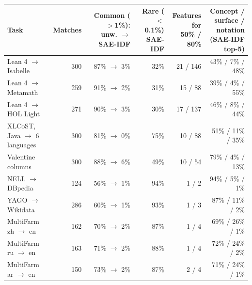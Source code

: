\begin{tabular}{@{}lrrrrr@{}}
\toprule
Task & Matches & \makecell[r]{Common ($>$1\%):\\unw. $\to$ SAE-IDF} & \makecell[r]{Rare ($<$0.1\%)\\SAE-IDF} & \makecell[r]{Features for\\50\% / 80\%} & \makecell[r]{Concept / surface / notation\\(SAE-IDF top-5)} \\
\midrule
Lean 4 $\to$ Isabelle & 300 & 87\% $\to$ 3\% & 32\% & 21 / 146 & 43\% / 7\% / 48\% \\
Lean 4 $\to$ Metamath & 259 & 91\% $\to$ 2\% & 31\% & 15 / 88 & 39\% / 4\% / 55\% \\
Lean 4 $\to$ HOL Light & 271 & 90\% $\to$ 3\% & 30\% & 17 / 137 & 46\% / 8\% / 44\% \\
XLCoST, Java $\to$ 6 languages & 300 & 81\% $\to$ 0\% & 75\% & 10 / 88 & 51\% / 11\% / 35\% \\
Valentine columns & 300 & 88\% $\to$ 6\% & 49\% & 10 / 54 & 79\% / 4\% / 13\% \\
NELL $\to$ DBpedia & 124 & 56\% $\to$ 1\% & 94\% & 1 / 2 & 94\% / 5\% / 1\% \\
YAGO $\to$ Wikidata & 286 & 60\% $\to$ 1\% & 93\% & 1 / 3 & 87\% / 11\% / 2\% \\
MultiFarm zh $\to$ en & 162 & 70\% $\to$ 2\% & 87\% & 1 / 4 & 69\% / 26\% / 1\% \\
MultiFarm ru $\to$ en & 163 & 71\% $\to$ 2\% & 88\% & 1 / 4 & 72\% / 24\% / 2\% \\
MultiFarm ar $\to$ en & 150 & 73\% $\to$ 2\% & 87\% & 2 / 4 & 71\% / 24\% / 1\% \\
\bottomrule
\end{tabular}
